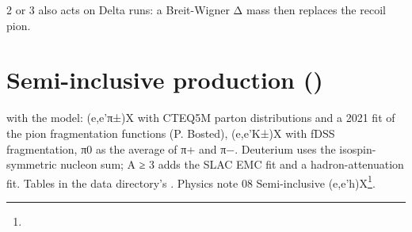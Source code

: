 \hyperref[param:whichu5fpion]{} 2 or 3 also acts on Delta runs: a Breit-Wigner Δ mass then replaces the recoil pion.

\section{\texorpdfstring{Semi-inclusive production ()}{Semi-inclusive production (doing\_\allowbreak{}semi)}}\label{user_manual-05u5freactions:56-semi-inclusive-production-doingu5fsemi}
 with the  model: (e,e'π±)X with CTEQ5M parton distributions and a 2021 fit of the pion
fragmentation functions (P. Bosted), (e,e'K±)X with fDSS fragmentation,\allowbreak{} π0 as the average of π+ and π−. Deuterium uses the
isospin-symmetric nucleon sum; A ≥ 3 adds the SLAC EMC fit and a hadron-attenuation fit. Tables in the data directory's
.
Physics note 08 Semi-inclusive (e,e'h)X\footnote{}.


